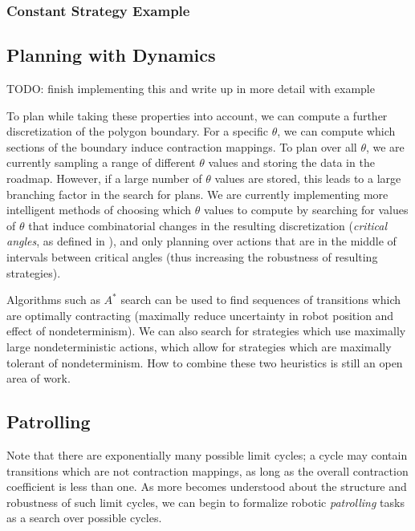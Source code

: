 \documentclass[]{article}
\newcommand{\todo}[1]{ {\color{red} #1} }
\begin{document}
\todo{\subsubsection{Constant Strategy Example}}

\todo{\subsection{Planning with Dynamics}

TODO: finish implementing this and write up in more detail with example

To plan while taking these properties into account, we can compute a further
discretization of the polygon boundary. For a specific $\theta$, we can compute
which sections of the boundary induce contraction mappings. To plan over all
$\theta$, we are currently sampling a range of different $\theta$ values and
storing the data in the roadmap. However, if a large number of $\theta$ values
are stored, this leads to a large branching factor in the search for plans. We
are currently implementing more intelligent methods of choosing which $\theta$
values to compute by searching for values of $\theta$ that induce combinatorial
changes in the resulting discretization ({\em critical angles}, as defined in
\cite{ErLav13}), and only planning over actions that are in the middle of
intervals between critical angles (thus increasing the robustness of resulting
strategies).


Algorithms such as $A^*$ search can be used to find sequences of
transitions which are optimally contracting (maximally reduce uncertainty in robot
position and effect of nondeterminism). We can also search for strategies which
use maximally large nondeterministic actions, which allow for strategies which
are maximally tolerant of nondeterminism. How to combine these two heuristics is
still an open area of work.
}


\subsection{Patrolling}

Note that there are
exponentially many possible limit cycles; a cycle may contain
transitions which are not contraction mappings, as long as the overall
contraction coefficient is less than one. As more becomes understood about the structure and robustness of
such limit cycles, we can begin to formalize robotic \emph{patrolling} tasks as a search over 
possible cycles.
\end{document}
